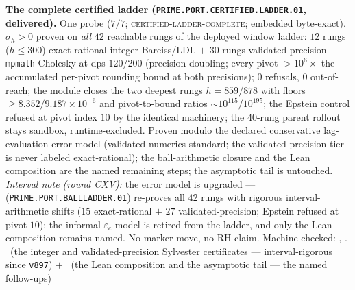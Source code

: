 \par\smallskip\noindent\textbf{The complete certified ladder
(\texttt{PRIME.PORT.CERTIFIED.\allowbreak LADDER.01},
delivered).}
One probe ($7/7$; \textsc{certified-ladder-complete}; embedded
byte-exact).  $\sigma_h > 0$ proven on \emph{all} $42$ reachable
rungs of the deployed window ladder: $12$ rungs ($h \le 300$)
exact-rational integer Bareiss/LDL $+$ $30$ rungs
validated-precision \texttt{mpmath} Cholesky at dps $120/200$
(precision doubling; every pivot $> 10^{6}\times$ the
accumulated per-pivot rounding bound at both precisions); $0$
refusals, $0$ out-of-reach; the module closes the two deepest
rungs $h = 859/878$ with floors $\ge
8.352/9.187\times10^{-6}$ and pivot-to-bound ratios
${\sim}10^{115}/10^{195}$; the Epstein control refused at pivot
index $10$ by the identical machinery; the $40$-rung parent
rollout stays sandbox, runtime-excluded.  Proven modulo the
declared conservative lag-evaluation error model
(validated-numerics standard; the validated-precision tier is
never labeled exact-rational); the ball-arithmetic closure and
the Lean composition are the named remaining steps; the
asymptotic tail is untouched.  \emph{Interval note (round CXV):}
the error model is upgraded ---
(\texttt{PRIME.PORT.BALLLADDER.01}) re-proves all $42$ rungs
with rigorous interval-arithmetic shifts ($15$ exact-rational
$+$ $27$ validated-precision; Epstein refused at pivot $10$);
the informal $\varepsilon_c$ model is retired from the ladder,
and only the Lean composition remains named.  No marker move, no
RH claim.
Machine-checked: ,
.
\mE\ (the integer and validated-precision Sylvester
certificates --- interval-rigorous since \texttt{v897})
$+$ \mO\ (the Lean composition and the asymptotic tail
--- the named follow-ups)
\par\smallskip


